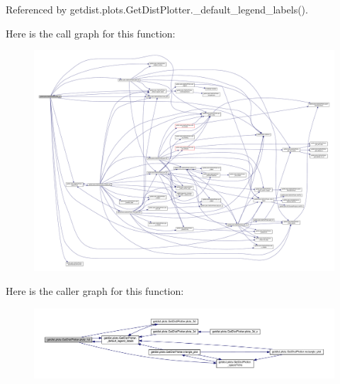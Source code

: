 Referenced by getdist.\+plots.\+Get\+Dist\+Plotter.\+\_\+default\+\_\+legend\+\_\+labels().

Here is the call graph for this function\+:
\nopagebreak
\begin{figure}[H]
\begin{center}
\leavevmode
\includegraphics[width=350pt]{classgetdist_1_1plots_1_1GetDistPlotter_a7cd2a179b15d78d19f07760d0ba698a1_cgraph}
\end{center}
\end{figure}
Here is the caller graph for this function\+:
\nopagebreak
\begin{figure}[H]
\begin{center}
\leavevmode
\includegraphics[width=350pt]{classgetdist_1_1plots_1_1GetDistPlotter_a7cd2a179b15d78d19f07760d0ba698a1_icgraph}
\end{center}
\end{figure}
\mbox{\label{classgetdist_1_1plots_1_1GetDistPlotter_a0e610a87566737a4b66974d2d721caaa}} 
